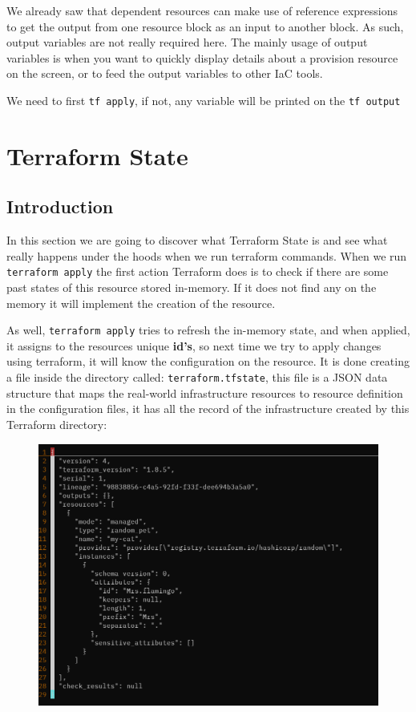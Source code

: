 \documentclass{article}
\newenvironment{blocktemplateIII}[1]{%
    \tcolorbox[beamer,%
    noparskip,breakable,
    ,colframe=Red,%
    colbacklower=LimeGreen!75!LightGreen,%
    title=#1]}%
    {\endtcolorbox}
\begin{document}
We already saw that dependent resources can make use of reference expressions to get the output from one resource block as an input to another block. As such, output variables are not really required here. The mainly usage of output variables is when you want to quickly display details about a provision resource on the screen, or to feed the output variables to other IaC tools.

\begin{blocktemplateIII}{WARNING}
We need to first \verb+tf apply+, if not, any variable will be printed on the \verb+tf output+
\end{blocktemplateIII}

\newpage
\section{Terraform State}

\subsection{Introduction}
In this section we are going to discover what Terraform State is and see what really happens under the hoods when we run terraform commands. When we run \verb+terraform apply+ the first action Terraform does is to check if there are some past states of this resource stored in-memory. If it does not find any on the memory it will implement the creation of the resource.

As well, \verb+terraform apply+ tries to refresh the in-memory state, and when applied, it assigns to the resources unique \textbf{id's}, so next time we try to apply changes using terraform, it will know the configuration on the resource. It is done creating a file inside the directory called: \verb+terraform.tfstate+, this file is a JSON data structure that maps the real-world infrastructure resources to resource definition in the configuration files, it has all the record of the infrastructure created by this Terraform directory:

\begin{figure}[H]
    \includegraphics[width=\textwidth]{pictures/pic8.png}
    \centering
\end{figure}
\end{document}
